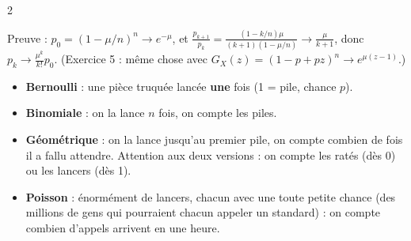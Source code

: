 \documentclass[a4paper,9pt]{extarticle}
\begin{document}
\begin{multicols}{2}
\begin{important}
\vspace{3pt}

Preuve : $p_0 = (1-\mu/n)^n \to e^{-\mu}$, et $\frac{p_{k+1}}{p_k} = \frac{(1-k/n)\mu}{(k+1)(1-
\mu/n)} \to \frac{\mu}{k+1}$, donc $p_k \to \frac{\mu^k}{k!}p_0$. (Exercice 5 : même chose avec
$G_X(z) = (1-p+pz)^n \to e^{\mu(z-1)}$.)

\end{important}


\begin{simple}

\begin{itemize}

\item \textbf{Bernoulli} : une pièce truquée lancée \textbf{une} fois (1 = pile, chance $p$).

\item \textbf{Binomiale} : on la lance $n$ fois, on compte les piles.

\item \textbf{Géométrique} : on la lance jusqu'au premier pile, on compte combien de fois il a
fallu attendre. Attention aux deux versions : on compte les ratés (dès 0) ou les lancers (dès
1).

\item \textbf{Poisson} : énormément de lancers, chacun avec une toute petite chance (des
millions de gens qui pourraient chacun appeler un standard) : on compte combien d'appels
arrivent en une heure.

\end{itemize}

\end{simple}

\end{multicols}
\end{document}
